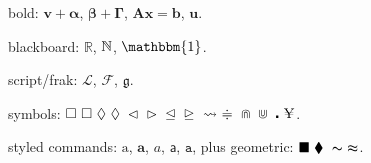\documentclass{article}
\begin{document}
bold: $\bm{v}+\bm{\alpha}$, $\boldsymbol{\beta}+\boldsymbol{\Gamma}$,
$\mathbf{Ax}=\mathbf{b}$, $\symbf{u}$.

blackboard: $\mathbb{R}$, $\Bbb{N}$, $\mathbbm{1}$.

script/frak: $\mathcal{L}$, $\mathscr{F}$, $\mathfrak{g}$.

symbols: $\Box\ \square\ \Diamond\ \lozenge\ \lhd\ \rhd\ \unlhd\ \unrhd\ \leadsto\ \doteqdot\ \doublecap\ \doublecup\ \centerdot\ \yen$.

styled commands: $\mathrm{a}$, $\mathbf{a}$, $\mathit{a}$, $\mathsf{a}$, $\mathtt{a}$,
plus geometric: $\blacksquare\ \blacklozenge\ \thicksim\ \thickapprox$.
\end{document}
